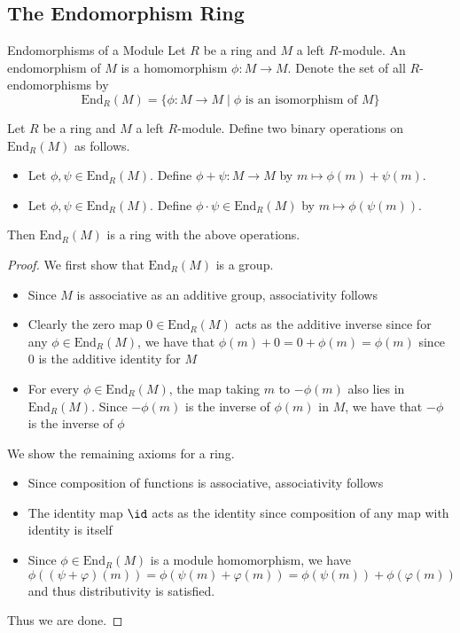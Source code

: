 \documentclass[a4paper]{article}
\begin{document}
\subsection{The Endomorphism Ring}
\begin{defn}{Endomorphisms of a Module}{} Let $R$ be a ring and $M$ a left $R$-module. An endomorphism of $M$ is a homomorphism $\phi:M\to M$. Denote the set of all $R$-endomorphisms by $$\text{End}_R(M)=\{\phi:M\to M\;|\;\phi\text{ is an isomorphism of }M\}$$
\end{defn}

\begin{prp}{}{} Let $R$ be a ring and $M$ a left $R$-module. Define two binary operations on $\text{End}_R(M)$ as follows. 
\begin{itemize}
\item Let $\phi,\psi\in\text{End}_R(M)$. Define $\phi+\psi:M\to M$ by $m\mapsto\phi(m)+\psi(m)$. 
\item Let $\phi,\psi\in\text{End}_R(M)$. Define $\phi\cdot\psi\in\text{End}_R(M)$ by $m\mapsto\phi(\psi(m))$. 
\end{itemize}
Then $\text{End}_R(M)$ is a ring with the above operations. 
\begin{proof}
We first show that $\text{End}_R(M)$ is a group. 
\begin{itemize}
\item Since $M$ is associative as an additive group, associativity follows
\item Clearly the zero map $0\in\text{End}_R(M)$ acts as the additive inverse since for any $\phi\in\text{End}_R(M)$, we have that $\phi(m)+0=0+\phi(m)=\phi(m)$ since $0$ is the additive identity for $M$
\item For every $\phi\in\text{End}_R(M)$, the map taking $m$ to $-\phi(m)$ also lies in $\text{End}_R(M)$. Since $-\phi(m)$ is the inverse of $\phi(m)$ in $M$, we have that $-\phi$ is the inverse of $\phi$
\end{itemize}
We show the remaining axioms for a ring. 
\begin{itemize}
\item Since composition of functions is associative, associativity follows
\item The identity map $\id$ acts as the identity since composition of any map with identity is itself
\item Since $\phi\in\text{End}_R(M)$ is a module homomorphism, we have $$\phi((\psi+\varphi)(m))=\phi(\psi(m)+\varphi(m))=\phi(\psi(m))+\phi(\varphi(m))$$ and thus distributivity is satisfied. 
\end{itemize}
Thus we are done. 
\end{proof}
\end{prp}
\end{document}
